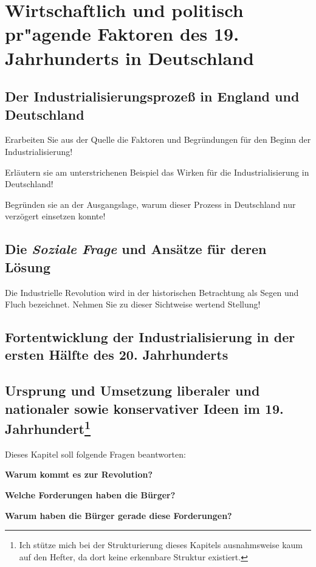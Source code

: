 \part{Wirtschaftlich und politisch pr"agende Faktoren des 19.
Jahrhunderts in Deutschland}
\label{prt:wirtsch-pol}

\chapter{Der Industrialisierungsprozeß in England und Deutschland}
\label{chp:indust-d-e}

\begin{aufgabe}
Erarbeiten Sie aus der Quelle die Faktoren und Begründungen für den
Beginn der Industrialisierung! 

Erläutern sie am unterstrichenen Beispiel das Wirken für die
Industrialisierung in Deutschland!

Begründen sie an der Ausgangslage, warum dieser Prozess in Deutschland
nur verzögert einsetzen konnte!
\end{aufgabe}





\chapter{Die \emph{Soziale Frage} und Ansätze für deren Lösung}
\label{chp:soziale-frage}

\begin{aufgabe}
Die Industrielle Revolution wird in der historischen Betrachtung als
Segen und Fluch bezeichnet. Nehmen Sie zu dieser Sichtweise wertend
Stellung! 
\end{aufgabe}







\chapter[Fortentwicklung der Industrialisierung in der ersten Hälfte
des 20. Jh.] {Fortentwicklung der Industrialisierung in der ersten
Hälfte des 20. Jahrhunderts}
\label{chp:fortentw-indust}







\chapter[Ursprung und Umsetzung liberaler, nationaler und
kons. Ideen im 19. Jh.]{Ursprung und Umsetzung liberaler und
nationaler sowie konservativer Ideen im 19. Jahrhundert\footnote{Ich
stütze mich bei der Strukturierung dieses Kapitels ausnahmsweise kaum
auf den Hefter, da dort keine erkennbare Struktur existiert.}}
\label{chp:lib-nat-kons}

Dieses Kapitel soll folgende Fragen beantworten:

\textbf{Warum kommt es zur Revolution?}

\textbf{Welche Forderungen haben die Bürger?}

\textbf{Warum haben die Bürger gerade diese Forderungen?}







\endinput
